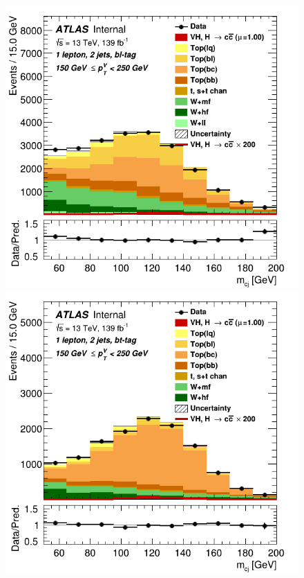 \begin{figure}[h!]
\center
\includegraphics[scale=0.2]{Images/VH/SRsandTopCRs/Region_distmBB_DtopCRBL_BMax250_L1_Y6051_TTypebl_T1_J2_BMin150_Prefit.png}
\includegraphics[scale=0.2]{Images/VH/SRsandTopCRs/Region_distmBB_DtopCRBC_BMax250_L1_Y6051_TTypebt_T1_J2_BMin150_Prefit.png}

\end{figure}

